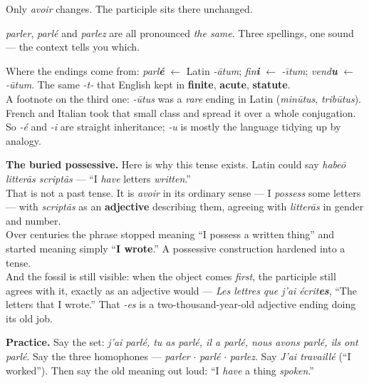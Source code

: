 Only \emph{avoir} changes. The participle sits there unchanged.

\begin{sounds}
\emph{parler}, \emph{parl\'{e}} and \emph{parlez} are all pronounced \emph{the
same}. Three spellings, one sound --- the context tells you which.
\end{sounds}

\begin{cousinweb}
Where the endings come from: \emph{parl\textbf{\'{e}}} $\leftarrow$ Latin
\emph{-\=atum}; \emph{fin\textbf{i}} $\leftarrow$ \emph{-\={\i}tum};
\emph{vend\textbf{u}} $\leftarrow$ \emph{-\=utum}. The same \emph{-t-} that
English kept in \textbf{finite}, \textbf{acute}, \textbf{statute}.\\[3pt]
A footnote on the third one: \emph{-\=utus} was a \emph{rare} ending in Latin
(\emph{min\=utus}, \emph{trib\=utus}). French and Italian took that small class
and spread it over a whole conjugation. So \emph{-\'{e}} and \emph{-i} are
straight inheritance; \emph{-u} is mostly the language tidying up by analogy.
\end{cousinweb}

\begin{grammarlens}
\textbf{The buried possessive.} Here is why this tense exists. Latin could say
\emph{habe\=o litter\=as script\=as} --- ``I \emph{have} letters
\emph{written}.''\\[3pt]
That is not a past tense. It is \emph{avoir} in its ordinary sense --- I
\emph{possess} some letters --- with \emph{script\=as} as an \textbf{adjective}
describing them, agreeing with \emph{litter\=as} in gender and number.\\[3pt]
Over centuries the phrase stopped meaning ``I possess a written thing'' and
started meaning simply ``\textbf{I wrote}.'' A possessive construction hardened
into a tense.\\[3pt]
And the fossil is still visible: when the object comes \emph{first}, the
participle still agrees with it, exactly as an adjective would ---
\emph{Les lettres que j'ai \'{e}crit\textbf{es}}, ``The letters that I wrote.''
That \emph{-es} is a two-thousand-year-old adjective ending doing its old job.
\end{grammarlens}

\begin{sounds}
\textbf{Practice.} Say the set: \emph{j'ai parl\'{e}, tu as parl\'{e}, il a
parl\'{e}, nous avons parl\'{e}, ils ont parl\'{e}}. Say the three homophones
--- \emph{parler} $\cdot$ \emph{parl\'{e}} $\cdot$ \emph{parlez}. Say
\emph{J'ai travaill\'{e}} (``I worked''). Then say the old meaning out loud:
``I \emph{have} a thing \emph{spoken}.''
\end{sounds}


